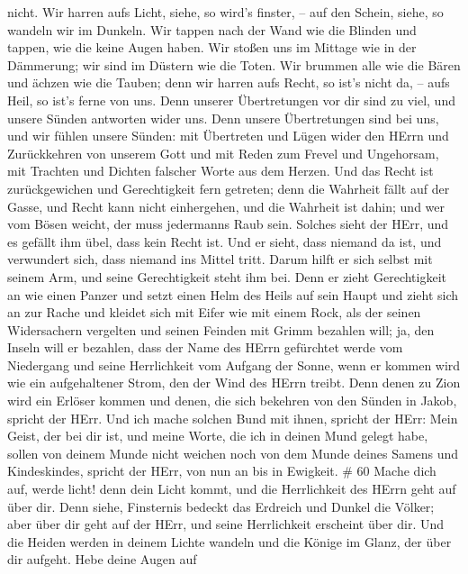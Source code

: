 nicht. Wir harren aufs Licht, siehe, so wird's finster, -- auf den
Schein, siehe, so wandeln wir im Dunkeln.  Wir tappen nach
der Wand wie die Blinden und tappen, wie die keine Augen haben. Wir
stoßen uns im Mittage wie in der Dämmerung; wir sind im Düstern wie die
Toten.  Wir brummen alle wie die Bären und ächzen wie die
Tauben; denn wir harren aufs Recht, so ist's nicht da, -- aufs Heil, so
ist's ferne von uns.  Denn unserer Übertretungen vor dir
sind zu viel, und unsere Sünden antworten wider uns. Denn unsere
Übertretungen sind bei uns, und wir fühlen unsere Sünden: 
mit Übertreten und Lügen wider den HErrn und Zurückkehren von unserem
Gott und mit Reden zum Frevel und Ungehorsam, mit Trachten und Dichten
falscher Worte aus dem Herzen.  Und das Recht ist
zurückgewichen und Gerechtigkeit fern getreten; denn die Wahrheit fällt
auf der Gasse, und Recht kann nicht einhergehen,  und die
Wahrheit ist dahin; und wer vom Bösen weicht, der muss jedermanns Raub
sein. Solches sieht der HErr, und es gefällt ihm übel, dass kein Recht
ist.  Und er sieht, dass niemand da ist, und verwundert
sich, dass niemand ins Mittel tritt. Darum hilft er sich selbst mit
seinem Arm, und seine Gerechtigkeit steht ihm bei.  Denn er
zieht Gerechtigkeit an wie einen Panzer und setzt einen Helm des Heils
auf sein Haupt und zieht sich an zur Rache und kleidet sich mit Eifer
wie mit einem Rock,  als der seinen Widersachern vergelten
und seinen Feinden mit Grimm bezahlen will; ja, den Inseln will er
bezahlen,  dass der Name des HErrn gefürchtet werde vom
Niedergang und seine Herrlichkeit vom Aufgang der Sonne, wenn er kommen
wird wie ein aufgehaltener Strom, den der Wind des HErrn treibt.
 Denn denen zu Zion wird ein Erlöser kommen und denen, die
sich bekehren von den Sünden in Jakob, spricht der HErr. 
Und ich mache solchen Bund mit ihnen, spricht der HErr: Mein Geist, der
bei dir ist, und meine Worte, die ich in deinen Mund gelegt habe, sollen
von deinem Munde nicht weichen noch von dem Munde deines Samens und
Kindeskindes, spricht der HErr, von nun an bis in Ewigkeit. \# 60
 Mache dich auf, werde licht! denn dein Licht kommt, und die
Herrlichkeit des HErrn geht auf über dir.  Denn siehe,
Finsternis bedeckt das Erdreich und Dunkel die Völker; aber über dir
geht auf der HErr, und seine Herrlichkeit erscheint über dir.
 Und die Heiden werden in deinem Lichte wandeln und die
Könige im Glanz, der über dir aufgeht.  Hebe deine Augen auf
